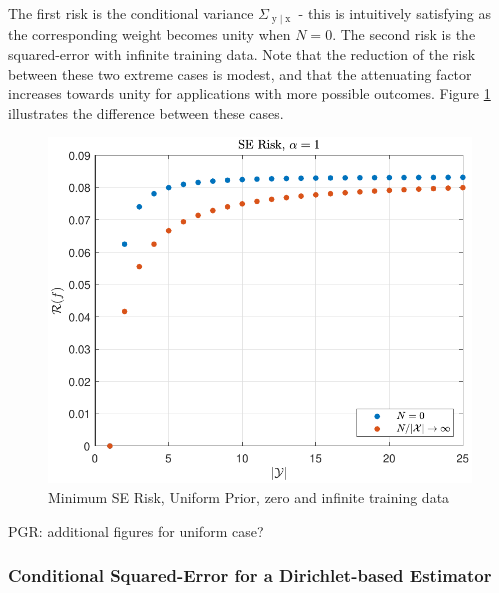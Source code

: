 \documentclass[12pt]{report}
\DeclareMathOperator{\xrm}{\mathrm{x}}
\DeclareMathOperator{\yrm}{\mathrm{y}}
\DeclareMathOperator{\Xcal}{\mathcal{X}}
\begin{document}
The first risk is the conditional variance $\Sigma_{\yrm|\xrm}$ - this is intuitively satisfying as the corresponding weight becomes unity when $N=0$. The second risk is the squared-error with infinite training data. Note that the reduction of the risk between these two extreme cases is modest, and that the attenuating factor increases towards unity for applications with more possible outcomes. Figure \ref{fig:Risk_SE_uniform_N_lim} illustrates the difference between these cases.

\begin{figure}
\centering
\includegraphics[width=0.7\linewidth]{Risk_SE_uniform_N_lim.pdf}
\caption{Minimum SE Risk, Uniform Prior, zero and infinite training data}
\label{fig:Risk_SE_uniform_N_lim}
\end{figure}


PGR: additional figures for uniform case?

%
%




\subsubsection{Conditional Squared-Error for a Dirichlet-based Estimator}
\end{document}
